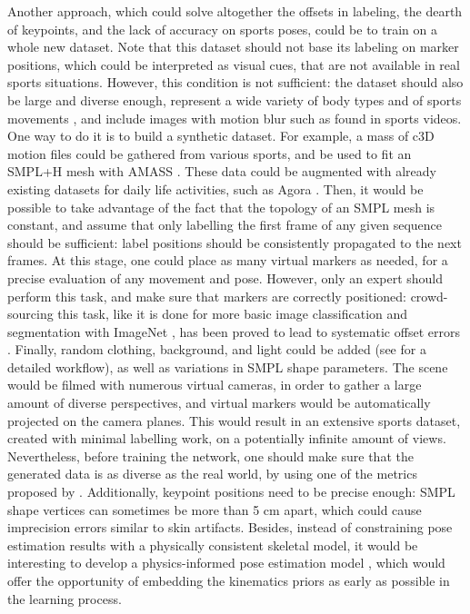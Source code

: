 Another approach, which could solve altogether the offsets in labeling, the dearth of keypoints, and the lack of accuracy on sports poses, could be to train on a whole new dataset. Note that this dataset should not base its labeling on marker positions, which could be interpreted as visual cues, that are not available in real sports situations. However, this condition is not sufficient: the dataset should also be large and diverse enough, represent a wide variety of body types and of sports movements \cite{Seethapathi2019}, and include images with motion blur such as found in sports videos. One way to do it is to build a synthetic dataset. For example, a mass of c3D motion files could be gathered from various sports, and be used to fit an SMPL+H mesh \cite{Pavlakos2019} with AMASS \cite{Mahmood2019}. These data could be augmented with already existing datasets for daily life activities, such as Agora \cite{Patel2021}. Then, it would be possible to take advantage of the fact that the topology of an SMPL mesh is constant, and assume that only labelling the first frame of any given sequence should be sufficient: label positions should be consistently propagated to the next frames. At this stage, one could place as many virtual markers as needed, for a precise evaluation of any movement and pose. However, only an expert should perform this task, and make sure that markers are correctly positioned: crowd-sourcing this task, like it is done for more basic image classification and segmentation with ImageNet \cite{Deng2009}, has been proved to lead to systematic offset errors \cite{Needham2021b}. Finally, random clothing, background, and light could be added (see \cite{Wood2021,Bolanos2021} for a detailed workflow), as well as variations in SMPL shape parameters. The scene would be filmed with numerous virtual cameras, in order to gather a large amount of diverse perspectives, and virtual markers would be automatically projected on the camera planes. This would result in an extensive sports dataset, created with minimal labelling work, on a potentially infinite amount of views. Nevertheless, before training the network, one should make sure that the generated data is as diverse as the real world, by using one of the metrics proposed by \cite{Borji2019, Borji2022}. Additionally, keypoint positions need to be precise enough: SMPL shape vertices can sometimes be more than 5 cm apart, which could cause imprecision errors similar to skin artifacts. Besides, instead of constraining pose estimation results with a physically consistent skeletal model, it would be interesting to develop a physics-informed pose estimation model \cite{Raissi2019}, which would offer the opportunity of embedding the kinematics priors as early as possible in the learning process.

